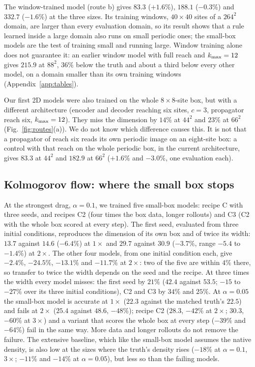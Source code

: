 The window-trained model (route b) gives $83.3$ ($+1.6\%$), $188.1$
($-0.3\%$) and $332.7$ ($-1.6\%$) at the three sizes. Its training windows,
$40\times40$ sites of a $264^2$ domain, are larger than every evaluation
domain, so its result shows that a rule learned inside a large domain
also runs on small periodic ones; the small-box models are the test of
training small and running large. Window training alone does not
guarantee it: an earlier window model with full reach and $k_{\max}=12$
gives $215.9$ at $88^2$, $36\%$ below the truth and about a third below every other model, on a
domain smaller than its own training windows (Appendix~\ref{app:tables}).

 Our first 2D models were also
trained on the whole $8\times8$-site box, but with a different
architecture (encoder and decoder reaching six sites, $c=3$, propagator
reach six, $k_{\max}=12$). They miss the dimension by $14\%$ at $44^2$ and $23\%$
at $66^2$ (Fig.~\ref{fig:routes}(a)). We do not know which difference
causes this. It is not that a propagator of reach six reads its own
periodic image on an eight-site box: a control with that reach on the
whole periodic box, in the current architecture, gives $83.3$ at $44^2$ and
$182.9$ at $66^2$ ($+1.6\%$ and $-3.0\%$, one evaluation each).

\subsection{Kolmogorov flow: where the small box stops}
\label{sec:kolm_box}

At the strongest drag, $\alpha=0.1$, we trained five small-box models:
recipe C with three seeds, and recipes C2 (four times the box data,
longer rollouts) and C3 (C2 with the whole box scored at every step).
The first seed, evaluated from three initial conditions, reproduces the
dimension of its own box and of twice its width: $13.7$ against $14.6$
($-6.4\%$) at $1\times$ and $29.7$ against $30.9$ ($-3.7\%$, range $-5.4$ to
$-1.4\%$) at $2\times$. The other four models, from one initial condition
each, give $-2.4\%$, $-24.5\%$, $-13.1\%$ and $-11.7\%$ at $2\times$: two of the
five are within $4\%$ there, so transfer to twice the width depends on the
seed and the recipe. At three times the width every model misses: the
first seed by $21\%$ ($42.4$ against $53.5$; $-15$ to $-27\%$ over its three
initial conditions), C2 and C3 by $34\%$ and $25\%$. At $\alpha=0.05$ the small-box model
is accurate at $1\times$ ($22.3$ against the matched truth's $22.5$) and
fails at $2\times$ ($25.4$ against $48.6$, $-48\%$); recipe C2 ($28.3$, $-42\%$
at $2\times$; $30.3$, $-60\%$ at $3\times$) and a variant that scores the whole
box at every step ($-39\%$ and $-64\%$) fail in the same way. More data and
longer rollouts do not remove the failure. The extensive baseline, which
like the small-box model assumes the native density, is also low at the
sizes where the truth's density rises ($-18\%$ at $\alpha=0.1$, $3\times$;
$-11\%$ and $-14\%$ at $\alpha=0.05$), but less so than the failing models.

